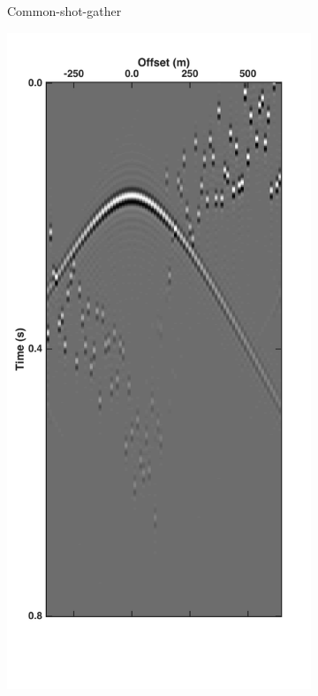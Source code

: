 \begin{figure}
\begin{subfigure}[t]{0.25\textwidth}
		\caption{Common-shot-gather}
		\label{fig:Ch-Theory-PseudoDeblendedCSG}
	\end{subfigure}
	\centering
	\begin{subfigure}[t]{0.25\textwidth}
		\includegraphics[width=\textwidth]{Plots/Mahdad/30iter/Pseudo-DeblendedCRG_rec30}	

\end{subfigure}
\end{figure}
